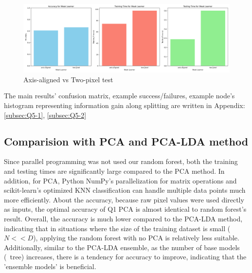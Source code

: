 \begin{figure}[htbp]
	\centering
	\includegraphics[width=0.8\linewidth]{image/q5-fig7.png}
	
	\caption{Axis-aligned vs Two-pixel test}
	\label{fig:q5-fig7}
\end{figure}
\vspace{-0.3cm}

The main results' confusion matrix, example success/failures, example node's histogram representing information gain along splitting are written in Appendix: \ref{subsec:Q5-1}, \ref{subsec:Q5-2}

\subsection{Comparision with PCA and PCA-LDA method}
Since parallel programming was not used our random forest, both the training and testing times are significantly large compared to the PCA method. In addition, for PCA, Python NumPy’s parallelization for matrix operations and scikit-learn’s optimized KNN classification can handle multiple data points much more efficiently.
About the accuracy, because raw pixel values were used directly as inputs, the optimal accuracy of Q1 PCA is almost identical to random forest's result. Overall, the accuracy is much lower compared to the PCA-LDA method, indicating that in situations where the size of the training dataset is small ($N << D$), applying the random forest with no PCA is relatively less suitable. Additionally, similar to the PCA-LDA ensemble, as the number of base models (~tree) increases, there is a tendency for accuracy to improve, indicating that the 'ensemble models' is beneficial.

